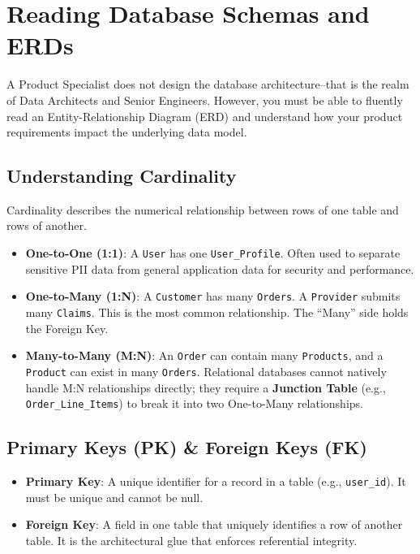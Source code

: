 \documentclass[
  11pt,
  openany,
  oneside]{book}
\providecommand{\tightlist}{%
  \setlength{\itemsep}{0pt}\setlength{\parskip}{0pt}}
\begin{document}
\bigskip

\section{Reading Database Schemas and
ERDs}\label{reading-database-schemas-and-erds}

A Product Specialist does not design the database architecture--that is
the realm of Data Architects and Senior Engineers. However, you must be
able to fluently read an Entity-Relationship Diagram (ERD) and
understand how your product requirements impact the underlying data
model.

\subsection{Understanding Cardinality}\label{understanding-cardinality}

Cardinality describes the numerical relationship between rows of one
table and rows of another.

\begin{itemize}
\tightlist
\item
  \textbf{One-to-One (1:1)}: A \texttt{User} has one
  \texttt{User\_Profile}. Often used to separate sensitive PII data from
  general application data for security and performance.
\item
  \textbf{One-to-Many (1:N)}: A \texttt{Customer} has many
  \texttt{Orders}. A \texttt{Provider} submits many \texttt{Claims}.
  This is the most common relationship. The ``Many'' side holds the
  Foreign Key.
\item
  \textbf{Many-to-Many (M:N)}: An \texttt{Order} can contain many
  \texttt{Products}, and a \texttt{Product} can exist in many
  \texttt{Orders}. Relational databases cannot natively handle M:N
  relationships directly; they require a \textbf{Junction Table} (e.g.,
  \texttt{Order\_Line\_Items}) to break it into two One-to-Many
  relationships.
\end{itemize}

\subsection{Primary Keys (PK) \& Foreign Keys
(FK)}\label{primary-keys-pk-foreign-keys-fk}

\begin{itemize}
\tightlist
\item
  \textbf{Primary Key}: A unique identifier for a record in a table
  (e.g., \texttt{user\_id}). It must be unique and cannot be null.
\item
  \textbf{Foreign Key}: A field in one table that uniquely identifies a
  row of another table. It is the architectural glue that enforces
  referential integrity.
\end{itemize}
\end{document}
